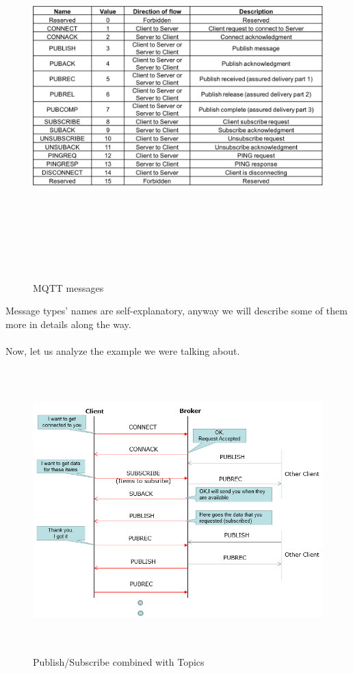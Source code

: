 \documentclass[12pt]{report}
\begin{document}
\begin{figure}[H]
\includegraphics[width=14cm,height=14cm,keepaspectratio]{mqtt_messages}
\centering
\caption{MQTT messages}
\label{fig:mqttmsgs}
\end{figure}

Message types' names are self-explanatory, anyway we will describe some of them more in details along the way.\\\\
Now, let us analyze the example we were talking about.

\begin{figure}[H]
\includegraphics[width=12cm,height=11cm,keepaspectratio]{pubsub_schema1}
\centering
\caption{Publish/Subscribe combined with Topics}
\label{fig:pubsubschema}
\end{figure}
\end{document}
